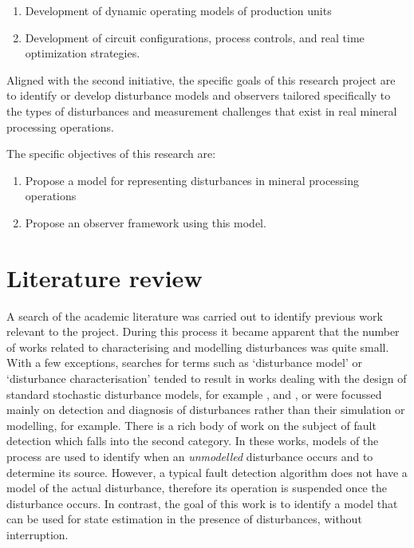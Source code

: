 \begin{enumerate}
	\item Development of dynamic operating models of production units
	\item Development of circuit configurations, process controls, and real time optimization strategies.
\end{enumerate}

Aligned with the second initiative, the specific goals of this research project are to identify or develop disturbance models and observers tailored specifically to the types of disturbances and measurement challenges that exist in real mineral processing operations.

The specific objectives of this research are:

\begin{enumerate}
	\item Propose a model for representing disturbances in mineral processing operations
	\item Propose an observer framework using this model.
\end{enumerate}

\section*{Literature review}

A search of the academic literature was carried out to identify previous work relevant to the project. During this process it became apparent that the number of works related to characterising and modelling disturbances was quite small. With a few exceptions, searches for terms such as `disturbance model' or `disturbance characterisation' tended to result in works dealing with the design of standard stochastic disturbance models, for example \cite{muske_disturbance_2002}, and \cite{pannocchia_robust_2003}, or were focussed mainly on detection and diagnosis of disturbances rather than their simulation or modelling, \cite{thornhill_advances_2007} for example. There is a rich body of work on the subject of fault detection which falls into the second category. In these works, models of the process are used to identify when an \textit{unmodelled} disturbance occurs and to determine its source. However, a typical fault detection algorithm does not have a model of the actual disturbance, therefore its operation is suspended once the disturbance occurs. In contrast, the goal of this work is to identify a model that can be used for state estimation in the presence of disturbances, without interruption.

